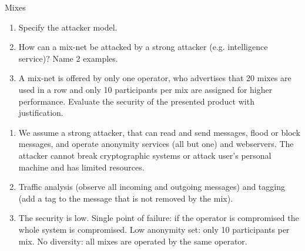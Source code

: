 \documentclass{article}
\begin{document}
\begin{exercise}{Mixes}
  \begin{enumerate}
    \item Specify the attacker model.
    \item How can a mix-net be attacked by a strong attacker (e.g. intelligence service)? Name 2 examples.
    \item A mix-net is offered by only one operator, who advertises that 20 mixes are used in a row and only 10 participants per mix are assigned for higher performance. Evaluate the security of the presented product with justification.
  \end{enumerate}

  \begin{solution}
    \begin{enumerate}
      \item We assume a strong attacker, that can read and send messages, flood or block messages, and operate anonymity services (all but one) and webservers. The attacker cannot break cryptographic systems or attack user's personal machine and has limited resources.
      \item Traffic analysis (observe all incoming and outgoing messages) and tagging (add a tag to the message that is not removed by the mix).
      \item  The security is low. Single point of failure: if the operator is compromised the whole system is compromised. Low anonymity set: only 10 participants per mix. No diversity: all mixes are operated by the same operator.
    \end{enumerate}
  \end{solution}
\end{exercise}
\end{document}
